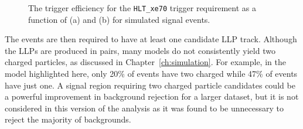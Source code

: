 \begin{figure}[h]
\centering
{}
\caption{The trigger efficiency for the \texttt{HLT\_xe70} trigger requirement as a function of (a) \met and (b) \calomet for simulated signal events.}
\label{fig:trigger_turnon}
\end{figure}

The events are then required to have at least one candidate \ac{LLP} track.
Although the \acp{LLP} are produced in pairs, many models do not consistently yield two charged particles, as discussed in Chapter~\ref{ch:simulation}.
For example, in the \rhadron model highlighted here, only 20\% of events have two charged \rhadrons while 47\% of events have just one.
A signal region requiring two charged particle candidates could be a powerful improvement in background rejection for a larger dataset, but it is not considered in this version of the analysis as it was found to be unnecessary to reject the majority of backgrounds.

